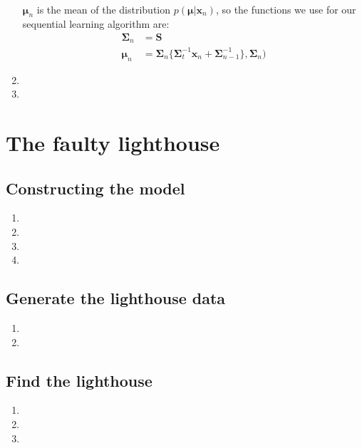 \documentclass[a4paper,10pt]{article}
\numberwithin{equation}{section} %
\numberwithin{figure}{section} %
\numberwithin{table}{section} %
\theoremstyle{mytheor}
\begin{document}
\begin{enumerate}
\begin{align}
		\end{align}
		$\boldsymbol \mu_n$ is the mean of the distribution $p(\boldsymbol \mu | \boldsymbol x_n)$, so the functions we use for our sequential learning algorithm are:
		\begin{align}
			\boldsymbol \Sigma_n &= \boldsymbol S\\
			\boldsymbol \mu_n &= \boldsymbol \Sigma_n \{ \boldsymbol \Sigma_t^{-1} \boldsymbol x_n + \boldsymbol{\Sigma}_{n-1}^{-1}\}, \boldsymbol \Sigma_n)
		\end{align}
	\item
	\item
\end{enumerate}

\section{The faulty lighthouse}
\subsection{Constructing the model}
\begin{enumerate}
	\item 
	\item 
	\item
	\item
\end{enumerate}

\subsection{Generate the lighthouse data}
\begin{enumerate}
	\item
	\item 
\end{enumerate}

\subsection{Find the lighthouse}
\begin{enumerate}
	\item
	\item 
	\item 
\end{enumerate}
\end{document}
